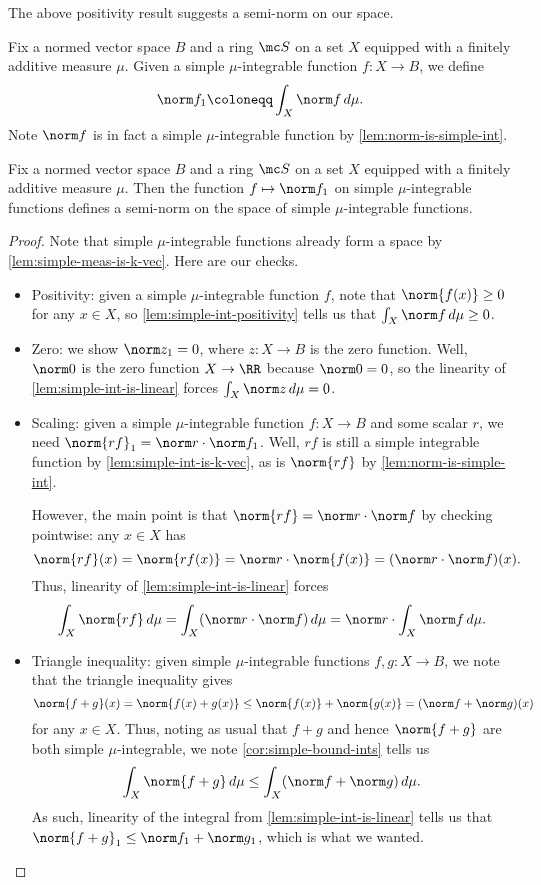 \documentclass[../notes.tex]{subfiles}
\begin{document}
The above positivity result suggests a semi-norm on our space.
\begin{notation}
	Fix a normed vector space $B$ and a ring $\mc S$ on a set $X$ equipped with a finitely additive measure $\mu$. Given a simple $\mu$-integrable function $f\colon X\to B$, we define
	\[\norm f_1\coloneqq\int_X\norm f\,d\mu.\]
	Note $\norm f$ is in fact a simple $\mu$-integrable function by \autoref{lem:norm-is-simple-int}.
\end{notation}
\begin{lemma} \label{lem:simple-l1-seminorm}
	Fix a normed vector space $B$ and a ring $\mc S$ on a set $X$ equipped with a finitely additive measure $\mu$. Then the function $f\mapsto\norm f_1$ on simple $\mu$-integrable functions defines a semi-norm on the space of simple $\mu$-integrable functions.
\end{lemma}
\begin{proof}
	Note that simple $\mu$-integrable functions already form a space by \autoref{lem:simple-meas-is-k-vec}. Here are our checks.
	\begin{itemize}
		\item Positivity: given a simple $\mu$-integrable function $f$, note that $\norm{f(x)}\ge0$ for any $x\in X$, so \autoref{lem:simple-int-positivity} tells us that $\int_X\norm f\,d\mu\ge0$.
		\item Zero: we show $\norm z_1=0$, where $z\colon X\to B$ is the zero function. Well, $\norm0$ is the zero function $X\to\RR$ because $\norm0=0$, so the linearity of \autoref{lem:simple-int-is-linear} forces $\int_X\norm z\,d\mu=0$.
		\item Scaling: given a simple $\mu$-integrable function $f\colon X\to B$ and some scalar $r$, we need $\norm{rf}_1=\norm r\cdot\norm f_1$. Well, $rf$ is still a simple integrable function by \autoref{lem:simple-int-is-k-vec}, as is $\norm{rf}$ by \autoref{lem:norm-is-simple-int}.

		However, the main point is that $\norm{rf}=\norm r\cdot\norm f$ by checking pointwise: any $x\in X$ has
		\[\norm{rf}(x)=\norm{rf(x)}=\norm r\cdot\norm{f(x)}=(\norm r\cdot\norm f)(x).\]
		Thus, linearity of \autoref{lem:simple-int-is-linear} forces
		\[\int_X\norm{rf}\,d\mu=\int_X(\norm r\cdot\norm f)\,d\mu=\norm r\cdot\int_X\norm f\,d\mu.\]
		\item Triangle inequality: given simple $\mu$-integrable functions $f,g\colon X\to B$, we note that the triangle inequality gives
		\[\norm{f+g}(x)=\norm{f(x)+g(x)}\le\norm{f(x)}+\norm{g(x)}=(\norm f+\norm g)(x)\]
		for any $x\in X$. Thus, noting as usual that $f+g$ and hence $\norm{f+g}$ are both simple $\mu$-integrable, we note \autoref{cor:simple-bound-ints} tells us
		\[\int_X\norm{f+g}\,d\mu\le\int_X(\norm f+\norm g)\,d\mu.\]
		As such, linearity of the integral from \autoref{lem:simple-int-is-linear} tells us that $\norm{f+g}_1\le\norm f_1+\norm g_1$, which is what we wanted.
		\qedhere
	\end{itemize}
\end{proof}
\end{document}
